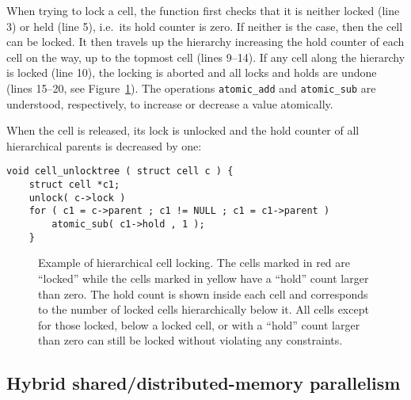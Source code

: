 \documentclass[final]{siamltex}
\newcommand{\fig}[1]
    {Figure~\ref{fig:#1}}
\begin{document}
\noindent When trying to lock a cell, the function first checks that it is neither
locked (line 3) or held (line 5), i.e.~its hold counter is zero.
If neither is the case, then the cell can be locked.
It then travels up the hierarchy increasing the 
hold counter of each cell on the way, up to the topmost cell (lines 9--14).
If any cell along the hierarchy is locked (line 10), the locking is aborted
and all locks and holds are undone (lines 15--20, see \fig{CellLocking}).
The operations {\tt atomic\_add} and {\tt atomic\_sub} are understood,
respectively, to increase or decrease a value atomically.

When the cell is released, its lock is unlocked and the hold
counter of all hierarchical parents is decreased by one:

\begin{center}\begin{minipage}{0.8\textwidth}
    \begin{lstlisting}
void cell_unlocktree ( struct cell c ) {
    struct cell *c1;
    unlock( c->lock )
    for ( c1 = c->parent ; c1 != NULL ; c1 = c1->parent )
        atomic_sub( c1->hold , 1 );
    }
    \end{lstlisting}
\end{minipage}\end{center}


\begin{figure}
    \centerline{}
    
    \caption{Example of hierarchical cell locking. The cells marked in red
        are ``locked'' while the cells marked in yellow have a ``hold'' count
        larger than zero.
        The hold count is shown inside each cell and corresponds to the number
        of locked cells hierarchically below it.
        All cells except for those locked, below a locked cell, or with
        a ``hold'' count larger than
        zero can still be locked without violating any constraints.
        }
    \label{fig:CellLocking}
\end{figure}


\subsection{Hybrid shared/distributed-memory parallelism}
\end{document}
